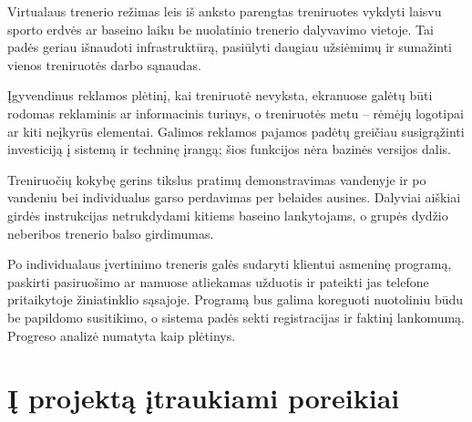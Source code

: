 \documentclass[a4paper,11pt]{article}
\begin{document}
Virtualaus trenerio režimas leis iš anksto parengtas treniruotes vykdyti laisvu sporto erdvės ar baseino laiku be nuolatinio trenerio dalyvavimo vietoje. Tai padės geriau išnaudoti infrastruktūrą, pasiūlyti daugiau užsiėmimų ir sumažinti vienos treniruotės darbo sąnaudas.

Įgyvendinus reklamos plėtinį, kai treniruotė nevyksta, ekranuose galėtų būti rodomas reklaminis ar informacinis turinys, o treniruotės metu -- rėmėjų logotipai ar kiti neįkyrūs elementai. Galimos reklamos pajamos padėtų greičiau susigrąžinti investiciją į sistemą ir techninę įrangą; šios funkcijos nėra bazinės versijos dalis.

Treniruočių kokybę gerins tikslus pratimų demonstravimas vandenyje ir po vandeniu bei individualus garso perdavimas per belaides ausines. Dalyviai aiškiai girdės instrukcijas netrukdydami kitiems baseino lankytojams, o grupės dydžio neberibos trenerio balso girdimumas.

Po individualaus įvertinimo treneris galės sudaryti klientui asmeninę programą, paskirti pasiruošimo ar namuose atliekamas užduotis ir pateikti jas telefone pritaikytoje žiniatinklio sąsajoje. Programą bus galima koreguoti nuotoliniu būdu be papildomo susitikimo, o sistema padės sekti registracijas ir faktinį lankomumą. Progreso analizė numatyta kaip plėtinys.

\section{Į projektą įtraukiami poreikiai}
\end{document}
